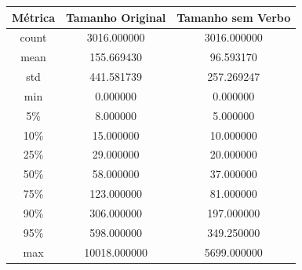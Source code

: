 \begin{center}
    \begin{tabular}{|c|c|c|}
        \hline
        \textbf{Métrica} & \textbf{Tamanho Original} & \textbf{Tamanho sem Verbo} \\
        \hline
        count & 3016.000000 & 3016.000000 \\
        \hline
        mean & 155.669430 & 96.593170 \\
        \hline
        std & 441.581739 & 257.269247 \\
        \hline
        min & 0.000000 & 0.000000 \\
        \hline
        5\% & 8.000000 & 5.000000 \\
        \hline
        10\% & 15.000000 & 10.000000 \\
        \hline
        25\% & 29.000000 & 20.000000 \\
        \hline
        50\% & 58.000000 & 37.000000 \\
        \hline
        75\% & 123.000000 & 81.000000 \\
        \hline
        90\% & 306.000000 & 197.000000 \\
        \hline
        95\% & 598.000000 & 349.250000 \\
        \hline
        max & 10018.000000 & 5699.000000 \\
        \hline
    \end{tabular}
\end{center}
